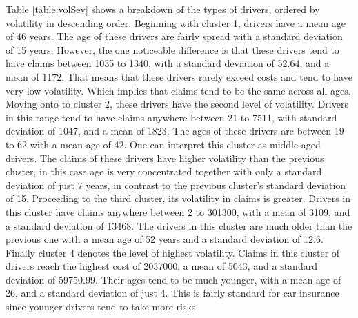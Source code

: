 \documentclass[11pt,letterpaper]{article}
\numberwithin{equation}{section}
\numberwithin{equation}{section}
\numberwithin{equation}{section}
\begin{document}
Table \ref{table:volSev} shows a breakdown of the types of drivers, ordered by volatility in descending order. Beginning with cluster 1, drivers have a mean age of 46 years. The age of these drivers are fairly spread with a standard deviation of 15 years. However, the one noticeable difference is that these drivers tend to have claims between 1035 to 1340, with a standard deviation of 52.64, and a mean of 1172. That means that these drivers rarely exceed costs and tend to have very low volatility. Which implies that claims tend to be the same across all ages. Moving onto to cluster 2, these drivers have the second level of volatility. Drivers in this range tend to have claims anywhere between 21 to 7511,%
with standard deviation of 1047, and a mean of 1823. The ages of these drivers are between 19 to 62 with a mean age of 42. One can interpret this cluster as middle aged drivers. The claims of these drivers have higher volatility than the previous cluster, in this case age is very concentrated together with only a standard deviation of just 7 years, in contrast to the previous cluster's standard deviation of 15. Proceeding to the third cluster, its volatility in claims is greater. Drivers in this cluster have claims anywhere between 2 to 301300, with a mean of 3109, and a standard deviation of 13468. The drivers in this cluster are much older than the previous one with a mean age of 52 years and a standard deviation of 12.6. Finally cluster 4 denotes the level of highest volatility. Claims in this cluster of drivers reach the highest cost of 2037000, a mean of 5043, and a standard deviation of 59750.99. Their ages tend to be much younger, with a mean age of 26, and a standard deviation of just 4. This is fairly standard  for car insurance since younger drivers tend to take more risks.
\end{document}
